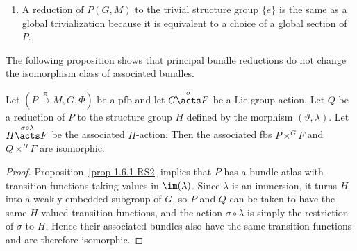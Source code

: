 \begin{example}[{{\cite[Ex.~1.6.6]{RS2}}}]
\begin{enumerate}
\begin{enumerate}
            \item If $\bbK=\bbC$, then a fiber metric can be seen as a section of the associated bundle
            \[\Fr(E)\times^{\GL_n(\bbC)} \widebar{{(\bbC^n)}}^\ast\odot (\bbC^n)^\ast,\]
            where $\odot$ is the symmetric tensor product. By the Sylvester Theorem, $\GL_n(\bbC)$ acts transitively on the subset of nondegenerate elements in $\widebar{{(\bbC^n)}}^\ast\odot(\bbC^n)^\ast$ with stabilizer $\U_n$. Thus $E$ admits a Hermitian fiber metric iff $\Fr(E)$ is reducible to a principal $\U_n$-bundle, which then coincides with the bundle of unitary frames $\Fr_{\U_n}(E)$.
        \end{enumerate}
        \item A reduction of $P(G,M)$ to the trivial structure group $\{e\}$ is the same as a global trivialization because it is equivalent to a choice of a global section of $P$.
    \end{enumerate}
\end{example}

The following proposition shows that principal bundle reductions do not change the isomorphism class of associated bundles.

\begin{prop}[{{\cite[Prop.~1.6.7]{RS2}}}]\label{prop 1.6.7 RS2}
    Let $(P\overset{\pi}{\to}M, G,\Phi)$ be a \gls{pfb} and let $G\overset{\sigma}{\acts}F$ be a Lie group action. Let $Q$ be a reduction of $P$ to the structure group $H$ defined by the morphism $(\vartheta,\lambda)$. Let $H\overset{\sigma\circ\lambda}{\acts}F$ be the associated $H$-action. Then the associated \glspl{fb} $P\times^G F$ and $Q\times^H F$ are isomorphic.
\end{prop}
\begin{proof}
    Proposition~\ref{prop 1.6.1 RS2} implies that $P$ has a bundle atlas with transition functions taking values in $\im(\lambda)$. Since $\lambda$ is an immersion, it turns $H$ into a weakly embedded subgroup of $G$, so $P$ and $Q$ can be taken to have the same $H$-valued transition functions, and the action $\sigma\circ\lambda$ is simply the restriction of $\sigma$ to $H$. Hence their associated bundles also have the same transition functions and are therefore isomorphic.
\end{proof}

